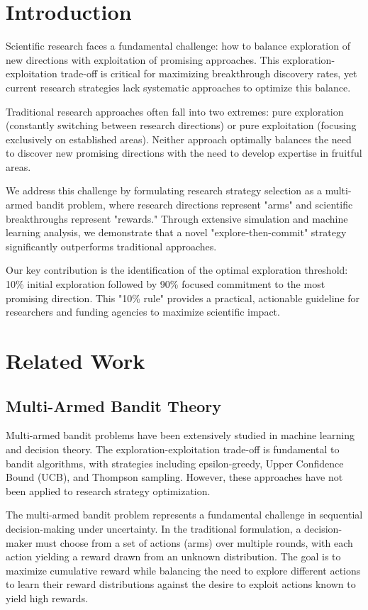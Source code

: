 \documentclass[letterpaper]{article} %
\begin{document}
\section{Introduction}

Scientific research faces a fundamental challenge: how to balance exploration of new directions with exploitation of promising approaches. This exploration-exploitation trade-off is critical for maximizing breakthrough discovery rates, yet current research strategies lack systematic approaches to optimize this balance.

Traditional research approaches often fall into two extremes: pure exploration (constantly switching between research directions) or pure exploitation (focusing exclusively on established areas). Neither approach optimally balances the need to discover new promising directions with the need to develop expertise in fruitful areas.

We address this challenge by formulating research strategy selection as a multi-armed bandit problem, where research directions represent "arms" and scientific breakthroughs represent "rewards." Through extensive simulation and machine learning analysis, we demonstrate that a novel "explore-then-commit" strategy significantly outperforms traditional approaches.

Our key contribution is the identification of the optimal exploration threshold: 10\% initial exploration followed by 90\% focused commitment to the most promising direction. This "10\% rule" provides a practical, actionable guideline for researchers and funding agencies to maximize scientific impact.

\section{Related Work}

\subsection{Multi-Armed Bandit Theory}

Multi-armed bandit problems have been extensively studied in machine learning and decision theory. The exploration-exploitation trade-off is fundamental to bandit algorithms, with strategies including epsilon-greedy, Upper Confidence Bound (UCB), and Thompson sampling. However, these approaches have not been applied to research strategy optimization.

The multi-armed bandit problem represents a fundamental challenge in sequential decision-making under uncertainty. In the traditional formulation, a decision-maker must choose from a set of actions (arms) over multiple rounds, with each action yielding a reward drawn from an unknown distribution. The goal is to maximize cumulative reward while balancing the need to explore different actions to learn their reward distributions against the desire to exploit actions known to yield high rewards.
\end{document}
